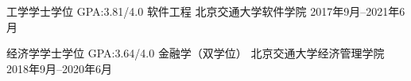 

\begin{cventries}

  \cventrye
    {工学学士学位 \hspace{1 mm}GPA:3.81/4.0} %
    {软件工程} %
    {北京交通大学软件学院} %
    {2017年9月--2021年6月} %
    

	\cventrye
	{经济学学士学位   \hspace{1 mm}GPA:3.64/4.0} %
	{金融学（双学位）} %
	{北京交通大学经济管理学院} %
	{2018年9月--2020年6月} %


\end{cventries}
